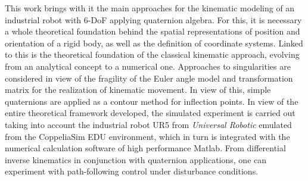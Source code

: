 This work brings with it the main approaches for the kinematic modeling of an industrial robot with 6-\gls{DoF} applying quaternion algebra. For this, it is necessary a whole theoretical foundation behind the spatial representations of position and orientation of a rigid body, as well as the definition of coordinate systems. Linked to this is the theoretical foundation of the classical kinematic approach, evolving from an analytical concept to a numerical one. Approaches to singularities are considered in view of the fragility of the Euler angle model and transformation matrix for the realization of kinematic movement. In view of this, simple quaternions are applied as a contour method for inflection points. In view of the entire theoretical framework developed, the simulated experiment is carried out taking into account the industrial robot UR5 from \textit{Universal Robotic} emulated from the CoppeliaSim EDU environment, which in turn is integrated with the numerical calculation software of high performance Matlab. From differential inverse kinematics in conjunction with quaternion applications, one can experiment with path-following control under disturbance conditions.

